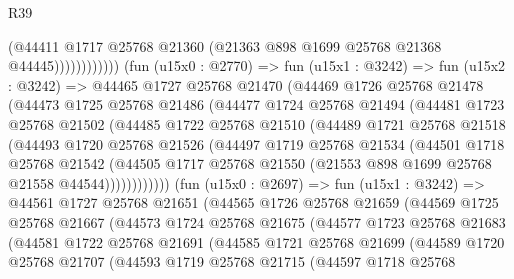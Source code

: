 \begin{lexlean}{R39}
\begin{coremodule}
                            (@44411
                              @1717
                              @25768
                              @21360
                              (@21363 @898 @1699 @25768 @21368 @44445))))))))))))
        (fun (u15x0 : @2770) =>
        fun (u15x1 : @3242) =>
        fun (u15x2 : @3242) =>
        @44465
          @1727
          @25768
          @21470
          (@44469
            @1726
            @25768
            @21478
            (@44473
              @1725
              @25768
              @21486
              (@44477
                @1724
                @25768
                @21494
                (@44481
                  @1723
                  @25768
                  @21502
                  (@44485
                    @1722
                    @25768
                    @21510
                    (@44489
                      @1721
                      @25768
                      @21518
                      (@44493
                        @1720
                        @25768
                        @21526
                        (@44497
                          @1719
                          @25768
                          @21534
                          (@44501
                            @1718
                            @25768
                            @21542
                            (@44505
                              @1717
                              @25768
                              @21550
                              (@21553 @898 @1699 @25768 @21558 @44544))))))))))))
        (fun (u15x0 : @2697) =>
        fun (u15x1 : @3242) =>
        @44561
          @1727
          @25768
          @21651
          (@44565
            @1726
            @25768
            @21659
            (@44569
              @1725
              @25768
              @21667
              (@44573
                @1724
                @25768
                @21675
                (@44577
                  @1723
                  @25768
                  @21683
                  (@44581
                    @1722
                    @25768
                    @21691
                    (@44585
                      @1721
                      @25768
                      @21699
                      (@44589
                        @1720
                        @25768
                        @21707
                        (@44593
                          @1719
                          @25768
                          @21715
                          (@44597
                            @1718
                            @25768

\end{coremodule}
\end{lexlean}
